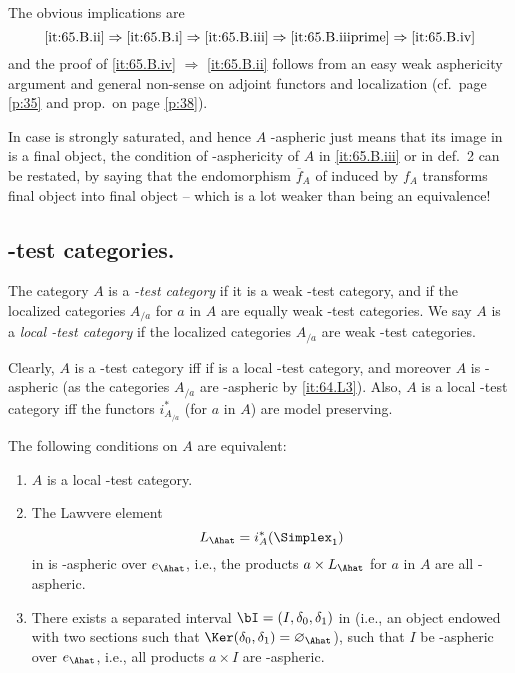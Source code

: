 The obvious implications are
\[ \text{\ref{it:65.B.ii}}
\Rightarrow \text{\ref{it:65.B.i}}
\Rightarrow \text{\ref{it:65.B.iii}}
\Rightarrow \text{\ref{it:65.B.iiiprime}}
\Rightarrow \text{\ref{it:65.B.iv}}\]
and the proof of \ref{it:65.B.iv} $\Rightarrow$ \ref{it:65.B.ii}
follows from an easy weak asphericity argument and general non-sense
on adjoint functors and localization (cf.\ page \ref{p:35} and prop.\
on page \ref{p:38}).
\begin{remark}
  In case \scrW{} is strongly saturated, and hence $A$ \scrW-aspheric
  just means that its image in \HotW{} is a final object, the
  condition of \scrW-asphericity of $A$ in \ref{it:65.B.iii} or in
  def.\ 2 can be restated, by saying that the endomorphism $\overline
  f_A$ of \HotW{} induced by $f_A$ transforms final object into final
  object -- which is a lot weaker than being an equivalence!
\end{remark}

\subsection{\texorpdfstring{\scrW}{W}-test categories.}
\label{subsec:65.C}
\begin{definitionnum}\label{def:65.3}
  The category $A$ is a \emph{\scrW-test category} if it
  is a weak \scrW-test category, and if the localized categories
  $A_{/a}$ for $a$ in $A$ are equally weak \scrW-test categories. We
  say $A$ is a \emph{local \scrW-test category} if the localized
  categories $A_{/a}$ are weak \scrW-test categories.
\end{definitionnum}

Clearly, $A$ is a \scrW-test category if{f} if is a local \scrW-test
category, and moreover $A$ is \scrW-aspheric (as the categories
$A_{/a}$ are \scrW-aspheric by \ref{it:64.L3}). Also, $A$ is a local
\scrW-test category if{f} the functors $i_{A_{/a}}^*$ (for $a$ in $A$)
are model preserving.
\begin{propositionnum}\label{prop:65.3}
  The following conditions on $A$ are equivalent:
  \begin{enumerate}[label=(\roman*),font=\normalfont]
  \item\label{it:65.C.i}
    $A$ is a local \scrW-test category.
  \item\label{it:65.C.ii}
    The Lawvere element
    \[L_\Ahat = i_A^*(\Simplex_1)\]
    in \Ahat{} is \scrWA-aspheric over $e_\Ahat$, i.e., the products
    $a\times L_\Ahat$ for $a$ in $A$ are all \scrW-aspheric.
  \item\label{it:65.C.iii}
    There exists a separated interval $\bI=(I,\delta_0,\delta_1)$ in
    \Ahat{} \textup(i.e., an object endowed with two sections such
    that $\Ker(\delta_0,\delta_1)=\varnothing_\Ahat$\textup), such that
    $I$ be \scrWA-aspheric over $e_\Ahat$, i.e., all products $a\times
    I$ are \scrW-aspheric.
  \end{enumerate}
\end{propositionnum}

